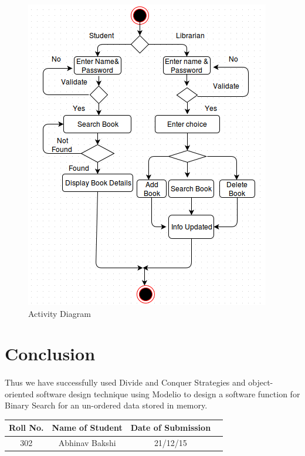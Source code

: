 \documentclass[a4paper,12pt]{article}
\begin{document}
\begin{figure}[htb!]
		
\includegraphics[scale = 0.80]{aaaa}
		\centering
		\caption{Activity Diagram}
		\label{Activity Diagram}
		\end{figure}



\section{Conclusion}
	\paragraph{} Thus we have successfully used Divide and Conquer Strategies and object-oriented software design technique using Modelio to design a software function for Binary Search for an un-ordered data stored in memory.
\vspace{20px}


\begin{center}
	\begin{tabular}
		{|c|c|c|c|}\hline
		{\bf Roll No.}		&{\bf  Name of Student}		  				&{\bf Date of Submission}  \\ \hline
		{302}	&	{Abhinav Bakshi}	& {21/12/15}  \\ \hline
	\end{tabular}\\ 
\end{center}
\newpage
\end{document}
